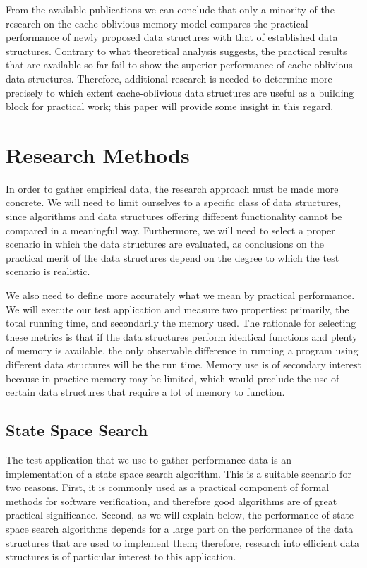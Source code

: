\documentclass{acm_proc_article-sp}
\begin{document}
From the available publications we can conclude that only a minority of the research on the cache-oblivious memory model compares the practical performance of newly proposed data structures with that of established data structures.
Contrary to what theoretical analysis suggests, the practical results that are available so far fail to show the superior performance of cache-oblivious data structures.
Therefore, additional research is needed to determine more precisely to which extent cache-oblivious data structures are useful as a building block for practical work; this paper will provide some insight in this regard.

\section{Research Methods}
In order to gather empirical data, the research approach must be made more concrete. We will need to limit ourselves to a specific class of data structures, since algorithms and data structures offering different functionality cannot be compared in a meaningful way. Furthermore, we will need to select a proper scenario in which the data structures are evaluated, as conclusions on the practical merit of the data structures depend on the degree to which the test scenario is realistic.

We also need to define more accurately what we mean by practical performance. We will execute our test application and measure two properties: primarily, the total running time, and secondarily the memory used. The rationale for selecting these metrics is that if the data structures perform identical functions and plenty of memory is available, the only observable difference in running a program using different data structures will be the run time. Memory use is of secondary interest because in practice memory may be limited, which would preclude the use of certain data structures that require a lot of memory to function.

\subsection{State Space Search}
The test application that we use to gather performance data is an implementation
of a state space search algorithm.
This is a suitable scenario for two reasons.
First, it is commonly used as a practical
component of formal methods for software verification, and therefore good
algorithms are of great practical significance. Second, as we will explain
below, the performance of state space search algorithms depends for a large
part on the performance of the data structures that are used to implement
them; therefore, research into efficient data structures is of particular
interest to this application.
\end{document}
